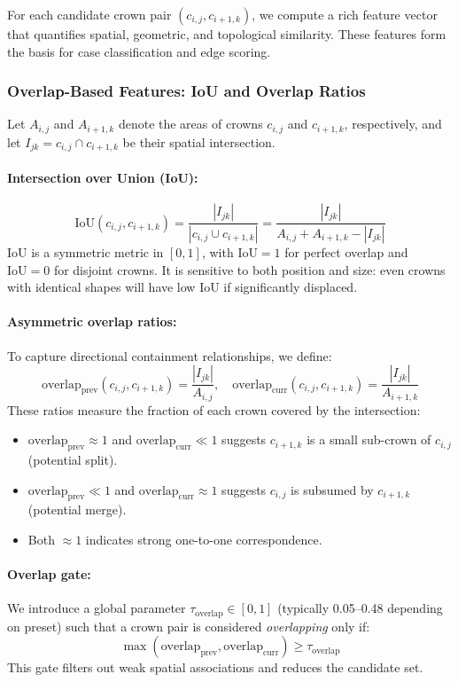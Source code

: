 For each candidate crown pair $(c_{i,j}, c_{i+1,k})$, we compute a rich feature vector that quantifies spatial, geometric, and topological similarity. These features form the basis for case classification and edge scoring.

\subsubsection{Overlap-Based Features: IoU and Overlap Ratios}

Let $A_{i,j}$ and $A_{i+1,k}$ denote the areas of crowns $c_{i,j}$ and $c_{i+1,k}$, respectively, and let $I_{jk} = c_{i,j} \cap c_{i+1,k}$ be their spatial intersection.

\paragraph{Intersection over Union (IoU):}
\[
\text{IoU}(c_{i,j}, c_{i+1,k}) = \frac{|I_{jk}|}{|c_{i,j} \cup c_{i+1,k}|} = \frac{|I_{jk}|}{A_{i,j} + A_{i+1,k} - |I_{jk}|}
\]
IoU is a symmetric metric in $[0,1]$, with $\text{IoU} = 1$ for perfect overlap and $\text{IoU} = 0$ for disjoint crowns. It is sensitive to both position and size: even crowns with identical shapes will have low IoU if significantly displaced.

\paragraph{Asymmetric overlap ratios:}
To capture directional containment relationships, we define:
\[
\text{overlap}_{\text{prev}}(c_{i,j}, c_{i+1,k}) = \frac{|I_{jk}|}{A_{i,j}}, \quad
\text{overlap}_{\text{curr}}(c_{i,j}, c_{i+1,k}) = \frac{|I_{jk}|}{A_{i+1,k}}
\]
These ratios measure the fraction of each crown covered by the intersection:
\begin{itemize}
    \item $\text{overlap}_{\text{prev}} \approx 1$ and $\text{overlap}_{\text{curr}} \ll 1$ suggests $c_{i+1,k}$ is a small sub-crown of $c_{i,j}$ (potential split).
    \item $\text{overlap}_{\text{prev}} \ll 1$ and $\text{overlap}_{\text{curr}} \approx 1$ suggests $c_{i,j}$ is subsumed by $c_{i+1,k}$ (potential merge).
    \item Both $\approx 1$ indicates strong one-to-one correspondence.
\end{itemize}

\paragraph{Overlap gate:} We introduce a global parameter $\tau_{\text{overlap}} \in [0,1]$ (typically 0.05--0.48 depending on preset) such that a crown pair is considered \emph{overlapping} only if:
\[
\max(\text{overlap}_{\text{prev}}, \text{overlap}_{\text{curr}}) \geq \tau_{\text{overlap}}
\]
This gate filters out weak spatial associations and reduces the candidate set.

